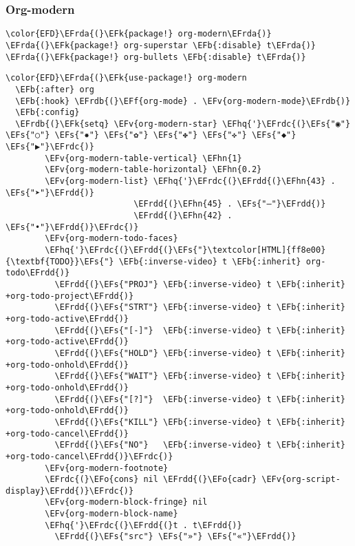 \documentclass[12pt]{article}
\theoremstyle{plain}%
\theoremstyle{definition}
\theoremstyle{remark}
\newcommand{\EFs}[1]{\textcolor{EFs}{#1}} %
\newcommand{\EFk}[1]{\textcolor{EFk}{#1}} %
\newcommand{\EFb}[1]{\textcolor{EFb}{#1}} %
\newcommand{\EFf}[1]{\textcolor{EFf}{#1}} %
\newcommand{\EFv}[1]{\textcolor{EFv}{#1}} %
\newcommand{\EFo}[1]{\textcolor{EFo}{#1}} %
\newcommand{\EFhn}[1]{\textcolor{EFhn}{\textbf{#1}}} %
\newcommand{\EFhq}[1]{\textcolor{EFhq}{#1}} %
\newcommand{\EFrda}[1]{\textcolor{EFrda}{#1}} %
\newcommand{\EFrdb}[1]{\textcolor{EFrdb}{#1}} %
\newcommand{\EFrdc}[1]{\textcolor{EFrdc}{#1}} %
\newcommand{\EFrdd}[1]{\textcolor{EFrdd}{#1}} %
\begin{document}
\subsubsection{Org-modern}
\label{sec:org0c5afbe}
\begin{Code}
\begin{Verbatim}
\color{EFD}\EFrda{(}\EFk{package!} org-modern\EFrda{)}
\EFrda{(}\EFk{package!} org-superstar \EFb{:disable} t\EFrda{)}
\EFrda{(}\EFk{package!} org-bullets \EFb{:disable} t\EFrda{)}
\end{Verbatim}
\end{Code}
\begin{Code}
\begin{Verbatim}
\color{EFD}\EFrda{(}\EFk{use-package!} org-modern
  \EFb{:after} org
  \EFb{:hook} \EFrdb{(}\EFf{org-mode} . \EFv{org-modern-mode}\EFrdb{)}
  \EFb{:config}
  \EFrdb{(}\EFk{setq} \EFv{org-modern-star} \EFhq{'}\EFrdc{(}\EFs{"◉"} \EFs{"○"} \EFs{"✸"} \EFs{"✿"} \EFs{"✤"} \EFs{"✜"} \EFs{"◆"} \EFs{"▶"}\EFrdc{)}
        \EFv{org-modern-table-vertical} \EFhn{1}
        \EFv{org-modern-table-horizontal} \EFhn{0.2}
        \EFv{org-modern-list} \EFhq{'}\EFrdc{(}\EFrdd{(}\EFhn{43} . \EFs{"➤"}\EFrdd{)}
                          \EFrdd{(}\EFhn{45} . \EFs{"–"}\EFrdd{)}
                          \EFrdd{(}\EFhn{42} . \EFs{"•"}\EFrdd{)}\EFrdc{)}
        \EFv{org-modern-todo-faces}
        \EFhq{'}\EFrdc{(}\EFrdd{(}\EFs{"}\textcolor[HTML]{ff8e00}{\textbf{TODO}}\EFs{"} \EFb{:inverse-video} t \EFb{:inherit} org-todo\EFrdd{)}
          \EFrdd{(}\EFs{"PROJ"} \EFb{:inverse-video} t \EFb{:inherit} +org-todo-project\EFrdd{)}
          \EFrdd{(}\EFs{"STRT"} \EFb{:inverse-video} t \EFb{:inherit} +org-todo-active\EFrdd{)}
          \EFrdd{(}\EFs{"[-]"}  \EFb{:inverse-video} t \EFb{:inherit} +org-todo-active\EFrdd{)}
          \EFrdd{(}\EFs{"HOLD"} \EFb{:inverse-video} t \EFb{:inherit} +org-todo-onhold\EFrdd{)}
          \EFrdd{(}\EFs{"WAIT"} \EFb{:inverse-video} t \EFb{:inherit} +org-todo-onhold\EFrdd{)}
          \EFrdd{(}\EFs{"[?]"}  \EFb{:inverse-video} t \EFb{:inherit} +org-todo-onhold\EFrdd{)}
          \EFrdd{(}\EFs{"KILL"} \EFb{:inverse-video} t \EFb{:inherit} +org-todo-cancel\EFrdd{)}
          \EFrdd{(}\EFs{"NO"}   \EFb{:inverse-video} t \EFb{:inherit} +org-todo-cancel\EFrdd{)}\EFrdc{)}
        \EFv{org-modern-footnote}
        \EFrdc{(}\EFo{cons} nil \EFrdd{(}\EFo{cadr} \EFv{org-script-display}\EFrdd{)}\EFrdc{)}
        \EFv{org-modern-block-fringe} nil
        \EFv{org-modern-block-name}
        \EFhq{'}\EFrdc{(}\EFrdd{(}t . t\EFrdd{)}
          \EFrdd{(}\EFs{"src"} \EFs{"»"} \EFs{"«"}\EFrdd{)}

\end{Verbatim}
\end{Code}
\end{document}

